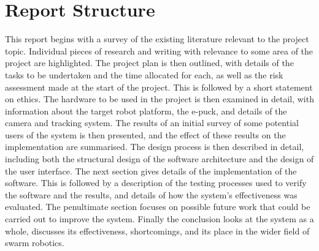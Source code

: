 \section{Report Structure}
This report begins with a survey of the existing literature relevant to the project topic. Individual pieces of research and writing with relevance to some area of the project are highlighted. The project plan is then outlined, with details of the tasks to be undertaken and the time allocated for each, as well as the risk assessment made at the start of the project. This is followed by a short statement on ethics. The hardware to be used in the project is then examined in detail, with information about the target robot platform, the e-puck, and details of the camera and tracking system. The results of an initial survey of some potential users of the system is then presented, and the effect of these results on the implementation are summarised. The design process is then described in detail, including both the structural design of the software architecture and the design of the user interface. The next section gives details of the implementation of the software. This is followed by a description of the testing processes used to verify the software and the results, and details of how the system's effectiveness was evaluated. The penultimate section focuses on possible future work that could be carried out to improve the system. Finally the conclusion looks at the system as a whole, discusses its effectiveness, shortcomings, and its place in the wider field of swarm robotics.